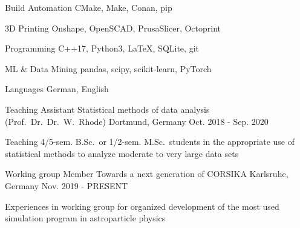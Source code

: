 \documentclass[11pt, a4paper]{Awesome-CV/awesome-cv}
\begin{document}
\begin{cvskills}
    \cvskill
    {Build Automation} %
    {CMake, Make, Conan, pip} %

    \cvskill
    {3D Printing}
    {Onshape, OpenSCAD, PrusaSlicer, Octoprint}


    \cvskill
    {Programming} %
    {C++17, Python3, LaTeX, SQLite, git} %

    \cvskill
    {ML \& Data Mining} %
    {pandas, scipy, scikit-learn, PyTorch} %

    \cvskill
    {Languages} %
    {German, English} %
\end{cvskills}

\begin{cventries}
    \cventry
    {Teaching Assistant} %
    {Statistical methods of data analysis (Prof.~Dr.~Dr.~W.~Rhode)} %
    {Dortmund, Germany} %
    {Oct. 2018 - Sep. 2020} %
    {
        \begin{cvitems} %
        \item {Teaching 4/5-sem. B.Sc.\ or 1/2-sem. M.Sc.~students in the appropriate use of statistical methods to analyze moderate to very large data sets}
        \end{cvitems}
    }

    \cventry
    {Working group Member} %
    {Towards a next generation of CORSIKA} %
    {Karlsruhe, Germany} %
    {Nov. 2019 - PRESENT} %
    {
        \begin{cvitems} %
        \item {Experiences in working group for organized development of the most used simulation program in astroparticle physics}
        \end{cvitems}
    }
\end{cventries}
\end{document}
